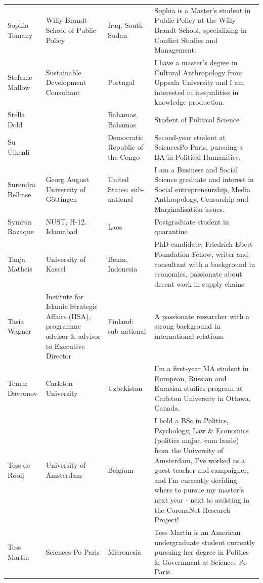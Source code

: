 \documentclass[]{article}
\begin{document}
\begin{longtable}{l>{\raggedright\arraybackslash}p{2cm}>{\raggedright\arraybackslash}p{2cm}>{\raggedright\arraybackslash}p{3cm}}
Sophia Tomany & Willy Brandt School of Public Policy & Iraq, South Sudan & Sophia is a Master's student in Public Policy at the Willy Brandt School, specializing in Conflict Studies and Management.\\
\addlinespace
\rowcolor{gray!6}  Stefanie Mallow & Sustainable Development Consultant & Portugal & I have a master's degree in Cultural Anthropology from Uppsala University and I am interested in inequalities in knowledge production.\\
Stella Dold &  & Bahamas, Bahamas & Student of Political Science\\
\rowcolor{gray!6}  Su Ülkenli &  & Democratic Republic of the Congo & Second-year student at SciencesPo Paris, pursuing a BA in Political Humanities.\\
Surendra Belbase & Georg August University of Göttingen & United States: sub-national & I am a Business and Social Science graduate and interest in Social entrepreneurship, Media Anthropology, Censorship and Marginalisation issues.\\
\rowcolor{gray!6}  Symrun Razaque & NUST, H-12. Islamabad & Laos & Postgraduate student in quarantine\\
\addlinespace
Tanja Matheis & University of Kassel & Benin, Indonesia & PhD candidate, Friedrich Ebert Foundation Fellow, writer and consultant with a background in economics, passionate about decent work in supply chains.\\
\rowcolor{gray!6}  Tasia Wagner & Institute for Islamic Strategic Affairs (IISA),  programme advisor \& advisor to Executive Director & Finland: sub-national & A passionate researcher with a strong background in international relations.\\
Temur Davronov & Carleton University & Uzbekistan & I'm a first-year MA student in European, Russian and Eurasian studies program at Carleton University in Ottawa, Canada.\\
\rowcolor{gray!6}  Tess de Rooij & University of Amsterdam & Belgium & I hold a BSc in Politics, Psychology, Law \& Economics (politics major, cum laude) from the University of Amsterdam. I've worked as a guest teacher and campaigner, and I'm currently deciding where to pursue my master's next year - next to assisting in the CoronaNet Research Project!\\
Tess Martin & Sciences Po Paris & Micronesia & Tess Martin is an American undergraduate student currently pursuing her degree in Politics \& Government at Sciences Po Paris.\\

\end{longtable}
\end{document}
